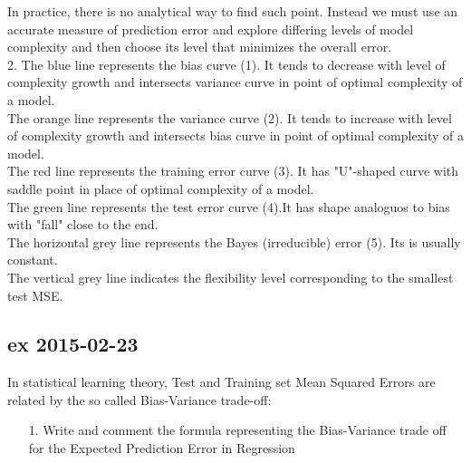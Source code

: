 \documentclass[a4paper,12pt,titlepage]{article} %
\begin{document}
In practice, there is no analytical way to find such point. Instead we must use an accurate measure of prediction error and explore differing levels of model complexity and then choose its level that minimizes the overall error. \\

2. The blue line represents the bias curve (1). It tends to decrease with level of complexity growth and intersects variance curve in point of optimal complexity of a model. \\
The orange line represents the variance curve (2). It tends to increase with level of complexity growth and intersects bias curve in point of optimal complexity of a model. \\
The red line represents the training error curve (3). It has "U"-shaped curve with saddle point in place of optimal complexity of a model. \\
The green line represents the test error curve (4).It has shape analoguos to bias with "fall" close to the end.\\
The horizontal grey line represents the Bayes (irreducible) error (5). Its is usually constant. \\
The vertical grey line indicates the flexibility level corresponding to the smallest test MSE.	\\
		



\subsection{ex 2015-02-23}
In statistical learning theory, Test and Training set Mean Squared Errors are related by the so called Bias-Variance trade-off:
\begin{itemize}
\item[1.] Write and comment the formula representing the Bias-Variance trade off for the Expected Prediction Error in Regression
\end{itemize}
\end{document}
